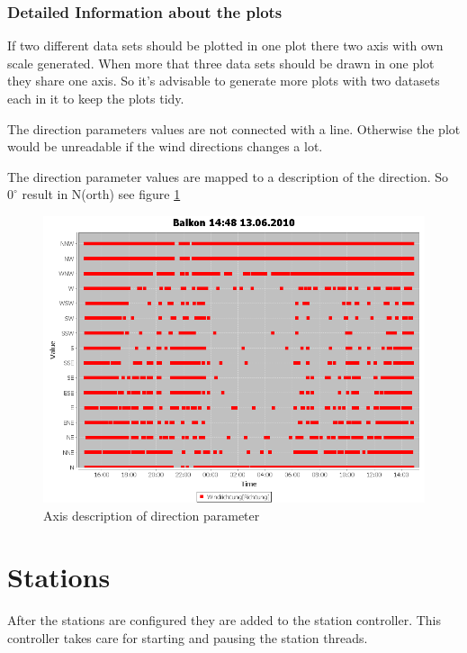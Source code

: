
\subsubsection{Detailed Information about the plots} %
\label{ssub:detailed_information_about_the_plots}
If two different data sets should be plotted in one plot there two axis with own scale generated. When more that three data sets should be drawn in one plot they share one axis. So it's advisable to generate more plots with two datasets each in it to keep the plots tidy.

The direction parameters values are not connected with a line. Otherwise the plot would be unreadable if the wind directions changes a lot.

The direction parameter values are mapped to a description of the direction. So $0^\circ$ result in N(orth) see figure \ref{fig:dir}
\begin{figure}[ht]
    \centering
    \includegraphics[width=0.9\linewidth]{master/plot_dir.png}
    \caption{Axis description of direction parameter}
    \label{fig:dir}
\end{figure}

\section{Stations} %
\label{sec:stations}

After the stations are configured they are added to the station controller. This controller takes care for starting and pausing the station threads. 

